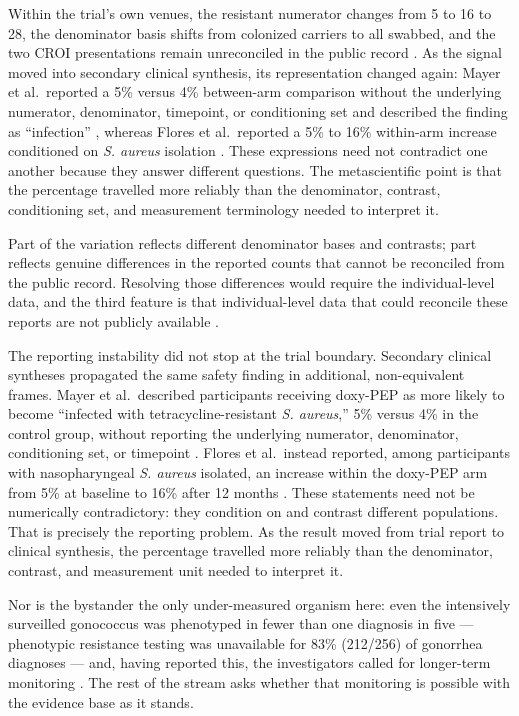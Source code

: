 \documentclass[10pt,letterpaper]{article}
\begin{document}
Within the trial's own venues, the resistant numerator changes from
5 to 16 to 28, the denominator basis shifts from colonized carriers to
all swabbed, and the two CROI presentations remain unreconciled in the
public record \cite{luetkemeyer2023, luetkemeyer2023croi,
cdc2024doxypep}. As the signal moved into secondary clinical synthesis,
its representation changed again: Mayer et al.\ reported a 5\% versus
4\% between-arm comparison without the underlying numerator,
denominator, timepoint, or conditioning set and described the finding
as ``infection'' \cite{mayer2023}, whereas Flores et al.\ reported a
5\% to 16\% within-arm increase conditioned on \emph{S. aureus}
isolation \cite{flores2025}. These expressions need not contradict one
another because they answer different questions. The metascientific
point is that the percentage travelled more reliably than the
denominator, contrast, conditioning set, and measurement terminology
needed to interpret it.

Part of the variation reflects different denominator bases and
contrasts; part reflects genuine differences in the reported counts that
cannot be reconciled from the public record. Resolving those differences
would require the individual-level data, and the third feature is that
individual-level data that could reconcile these reports are not publicly
available \cite{luetkemeyer2023}.

The reporting instability did not stop at the trial boundary.
Secondary clinical syntheses propagated the same safety finding in
additional, non-equivalent frames. Mayer et al.\ described participants
receiving doxy-PEP as more likely to become ``infected with
tetracycline-resistant \emph{S. aureus},'' 5\% versus 4\% in the control
group, without reporting the underlying numerator, denominator,
conditioning set, or timepoint \cite{mayer2023}. Flores et al.\ instead
reported, among participants with nasopharyngeal \emph{S. aureus}
isolated, an increase within the doxy-PEP arm from 5\% at baseline to
16\% after 12 months \cite{flores2025}. These statements need not be
numerically contradictory: they condition on and contrast different
populations. That is precisely the reporting problem. As the result
moved from trial report to clinical synthesis, the percentage travelled
more reliably than the denominator, contrast, and measurement unit
needed to interpret it.

Nor is the bystander the only under-measured organism here: even the
intensively surveilled gonococcus was phenotyped in fewer than one
diagnosis in five --- phenotypic resistance testing was unavailable for
83\% (212/256) of gonorrhea diagnoses --- and, having reported this, the
investigators called for longer-term monitoring
\cite{luetkemeyer2023croi}. The rest of the stream asks whether that
monitoring is possible with the evidence base as it stands.
\end{document}
